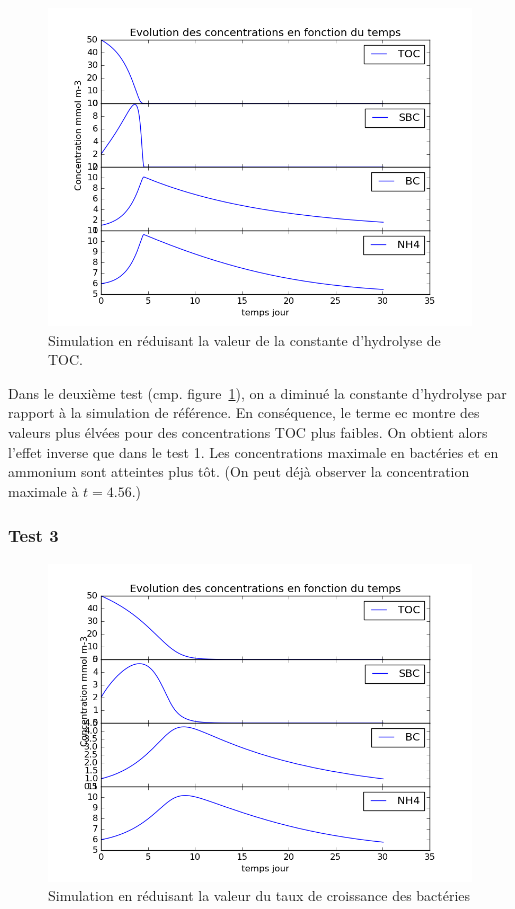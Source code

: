 \begin{figure}[h!]
  \includegraphics[width=\textwidth]{partie1/Test2.png}
  \caption{Simulation en r\'eduisant la valeur de la constante d'hydrolyse de TOC.
  }
  \label{fig:partie1test2}
\end{figure}

\par{
Dans le deuxième test (cmp. figure~\ref{fig:partie1test2}), on a diminué la constante d'hydrolyse par rapport à la simulation de référence.
En cons\'equence, le terme ec montre des valeurs plus élvées pour des concentrations TOC plus faibles. On obtient
alors l'effet inverse que dans le test 1. Les concentrations maximale en bactéries et en ammonium sont atteintes plus
tôt. (On peut déjà observer la concentration maximale à $t=4.56$.)
}

\FloatBarrier
\newpage
\subsubsection{Test 3}

\begin{figure}[h!]
  \includegraphics[width=\textwidth]{partie1/Test3.png}
  \caption{Simulation en r\'eduisant la valeur du taux de croissance des bact\'eries
  }
  \label{fig:partie1test3}
\end{figure}

